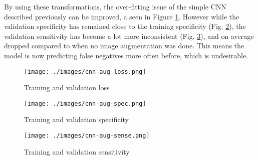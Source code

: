 \documentclass[12pt,a4paper,titlepage,twoside]{report}
\begin{document}
	By using these transformations, the over-fitting issue of the simple CNN described previously can be improved, a seen in Figure \ref{fig:cnn-aug-loss}. However while the validation specificity has remained close to the training specificity (Fig. \ref{fig:cnn-aug-spec}), the validation sensitivity has become a lot more inconsistent (Fig. \ref{fig:cnn-aug-sense}), and on average dropped compared to when no image augmentation was done. This means the model is now predicting false negatives more often before, which is undesirable.
	
	\begin{figure}[t]
		\centering
		\texttt{[image: ./images/cnn-aug-loss.png]}
		\caption{Training and validation loss}
		\label{fig:cnn-aug-loss}
	\end{figure}


	\begin{minipage}[b]{\linewidth}
	\begin{minipage}{0.45\textwidth}
		\begin{figure}[H]
			\centering
			\texttt{[image: ./images/cnn-aug-spec.png]}
			\caption{Training and validation specificity}
			\label{fig:cnn-aug-spec}
		\end{figure}
	\end{minipage}%
	\hspace{1cm}%
	\begin{minipage}{0.45\textwidth}
		\centering
		\begin{figure}[H]
			\centering
			\texttt{[image: ./images/cnn-aug-sense.png]}
			\caption{Training and validation sensitivity}
			\label{fig:cnn-aug-sense}
		\end{figure}
	\end{minipage}%
	\end{minipage}
	
\end{document}
